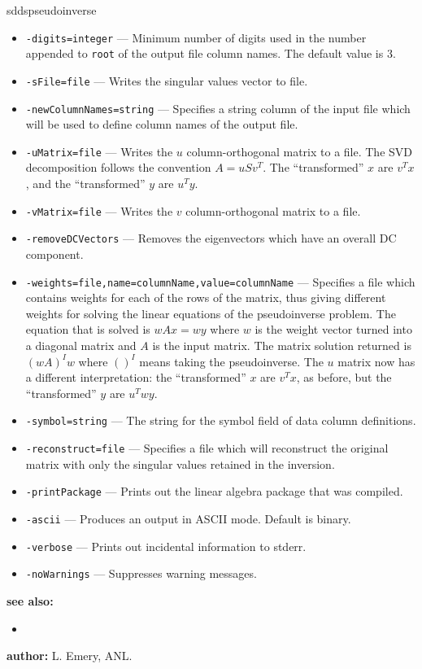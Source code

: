 \begin{sddsprog}{sddspseudoinverse}
\begin{itemize}
      \item \verb|-digits=integer| --- Minimum number of digits used in the number appended to \verb|root| of the output file column names. The default value is 3.
      \item \verb|-sFile=file| --- Writes the singular values vector to file.
      \item \verb|-newColumnNames=string| --- Specifies a string column of the input file which will be used to define column names of the output file.
      \item \verb|-uMatrix=file| --- Writes the $u$ column-orthogonal matrix to a file. The SVD decomposition follows the convention $A = u S v^T$. The ``transformed'' $x$ are $v^T x$, and the ``transformed'' $y$ are $u^T y$.
      \item \verb|-vMatrix=file| --- Writes the $v$ column-orthogonal matrix to a file.
      \item \verb|-removeDCVectors| --- Removes the eigenvectors which have an overall DC component.
      \item \verb|-weights=file,name=columnName,value=columnName| --- Specifies a file which contains weights for each of the rows of the matrix, thus giving different weights for solving the linear equations of the pseudoinverse problem. The equation that is solved is $wAx = wy$ where $w$ is the weight vector turned into a diagonal matrix and $A$ is the input matrix. The matrix solution returned is $(wA)^I w$ where $()^I$ means taking the pseudoinverse. The $u$ matrix now has a different interpretation: the ``transformed'' $x$ are $v^T x$, as before, but the ``transformed'' $y$ are $u^T w y$.
      \item \verb|-symbol=string| --- The string for the symbol field of data column definitions.
      \item \verb|-reconstruct=file| --- Specifies a file which will reconstruct the original matrix with only the singular values retained in the inversion.
      \item \verb|-printPackage| --- Prints out the linear algebra package that was compiled.
      \item \verb|-ascii| --- Produces an output in ASCII mode. Default is binary.
      \item \verb|-verbose| --- Prints out incidental information to stderr.
      \item \verb|-noWarnings| --- Suppresses warning messages.
    \end{itemize}
  \item {\bf see also:}
    \begin{itemize}
      \item {}
    \end{itemize}
  \item {\bf author:} L. Emery, ANL.
\end{sddsprog}
